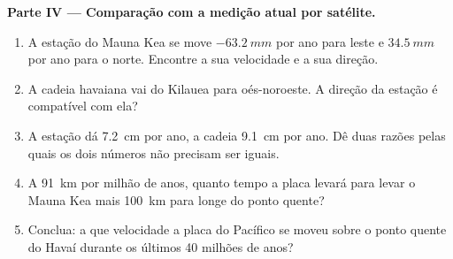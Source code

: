 \begin{problem}
\medskip
\noindent\textbf{Parte IV --- Comparação com a medição atual por satélite.}
\begin{enumerate}[resume]
  \item A estação do Mauna Kea se move $\qty{-63.2}{mm}$ por ano para leste
        e $\qty{+34.5}{mm}$ por ano para o norte. Encontre a sua velocidade e
        a sua direção.
  \item A cadeia havaiana vai do Kilauea para oés-noroeste. A direção da
        estação é compatível com ela?
  \item A estação dá \qty{7.2}{cm} por ano, a cadeia \qty{9.1}{cm} por ano.
        Dê duas razões pelas quais os dois números não precisam ser iguais.
  \item A \qty{91}{km} por milhão de anos, quanto tempo a placa levará para
        levar o Mauna Kea mais \qty{100}{km} para longe do ponto quente?
  \item Conclua: a que velocidade a placa do Pacífico se moveu sobre o ponto
        quente do Havaí durante os últimos 40 milhões de anos?
\end{enumerate}
\end{problem}
